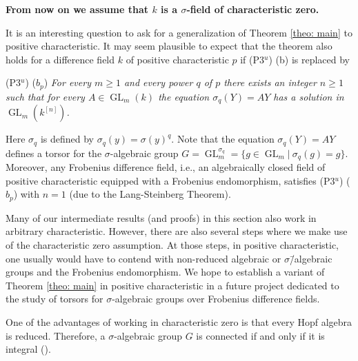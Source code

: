 \documentclass[oneside,reqno]{amsart}
\theoremstyle{definition}
\newcommand{\Gl}{\operatorname{GL}}
\newcommand{\s}{\sigma}
\newcommand{\kn}{k^{[n]}}
\newcommand{\pt}{{\rm{(P3$^u$)}}}
\begin{document}
\medskip

{\bf From now on we assume that $k$ is a $\s$-field of characteristic zero.} 

\medskip



It is an interesting question to ask for a generalization of Theorem \ref{theo: main} to positive characteristic. It may seem plausible to expect that the theorem also holds for a difference field $k$ of positive characteristic $p$ if \pt{} (b) is replaced by 

\medskip

\pt{} (\rm{$b_p$}) \emph{For every $m\geq 1$ and every power $q$ of $p$ there exists an integer $n\geq 1$ such that for every $A\in\Gl_m(k)$ the equation $\s_q(Y)=AY$ has a solution in $\Gl_m(\kn)$.}

\medskip

Here $\s_q$ is defined by $\s_q(y)=\s(y)^q$. Note that the equation $\s_q(Y)=AY$ defines a torsor for the $\s$-algebraic group $G=\Gl_m^{\s_q}=\{g\in\Gl_m|\ \s_q(g)=g\}$. Moreover, any Frobenius difference field, i.e., an algebraically closed field of positive characteristic equipped with a Frobenius endomorphism, satisfies \pt{} (\rm{$b_p$}) with $n=1$ (due to the Lang-Steinberg Theorem).

Many of our intermediate results (and proofs) in this section also work in arbitrary characteristic. However, there are also several steps where we make use of the characteristic zero assumption. At those steps, in positive characteristic, one usually would have to contend with non-reduced algebraic or $\s$\=/algebraic groups and the Frobenius endomorphism. We hope to establish a variant of Theorem \ref{theo: main} in positive characteristic in a future project dedicated to the study of torsors for $\s$-algebraic groups over Frobenius difference fields.




One of the advantages of working in characteristic zero is that every Hopf algebra is reduced. Therefore, a $\s$-algebraic group $G$ is connected if and only if it is integral (\cite[Lemma 6.7]{Wibmer:almostsimple}).


\medskip
\end{document}
